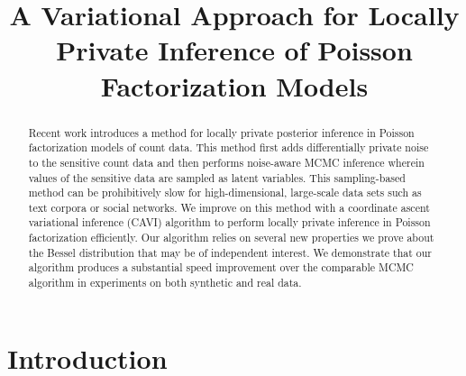 \documentclass{article}
\title{A Variational Approach for Locally Private Inference of Poisson Factorization Models}
\author{} %
\begin{document}
\maketitle

\begin{abstract}
  Recent work \cite{schein2018locally} introduces a method for locally private
  posterior inference in Poisson factorization models of count data. This method
  first adds differentially private noise to the sensitive count data and then
  performs noise-aware MCMC inference wherein values of the sensitive data are
  sampled as latent variables. This sampling-based method can be prohibitively
  slow for high-dimensional, large-scale data sets such as text corpora or
  social networks. We improve on this method with a coordinate ascent
  variational inference (CAVI) algorithm to perform locally private inference in
  Poisson factorization efficiently. Our algorithm relies on several new
  properties we prove about the Bessel distribution that may be of independent
  interest. We demonstrate that our algorithm produces a substantial speed
  improvement over the comparable MCMC algorithm in experiments on both
  synthetic and real data.
\end{abstract}

  \section{Introduction}
\end{document}
